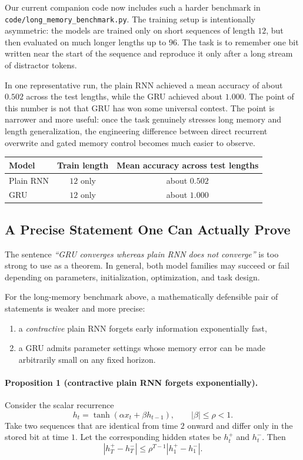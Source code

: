 \documentclass[12pt,a4paper]{article}
\begin{document}
Our current companion code now includes such a harder benchmark in
\texttt{code/long\_memory\_benchmark.py}. The training setup is intentionally asymmetric:
the models are trained only on short sequences of length \(12\), but then evaluated on much longer lengths up to \(96\). The task is to remember one bit written near the start of the sequence and reproduce it only after a long stream of distractor tokens.

In one representative run, the plain RNN achieved a mean accuracy of about \(0.502\) across the test lengths, while the GRU achieved about \(1.000\). The point of this number is not that GRU has won some universal contest. The point is narrower and more useful: once the task genuinely stresses long memory and length generalization, the engineering difference between direct recurrent overwrite and gated memory control becomes much easier to observe.

\begin{center}
\begin{tabular}{lcc}
\toprule
Model & Train length & Mean accuracy across test lengths \\
\midrule
Plain RNN & \(12\) only & about \(0.502\) \\
GRU & \(12\) only & about \(1.000\) \\
\bottomrule
\end{tabular}
\end{center}

\subsection{A Precise Statement One Can Actually Prove}

The sentence
\emph{``GRU converges whereas plain RNN does not converge''}
is too strong to use as a theorem. In general, both model families may succeed or fail depending on parameters, initialization, optimization, and task design.

For the long-memory benchmark above, a mathematically defensible pair of statements is weaker and more precise:
\begin{enumerate}
  \item a \emph{contractive} plain RNN forgets early information exponentially fast,
  \item a GRU admits parameter settings whose memory error can be made arbitrarily small on any fixed horizon.
\end{enumerate}

\paragraph{Proposition 1 (contractive plain RNN forgets exponentially).}
Consider the scalar recurrence
\[
h_t = \tanh(\alpha x_t + \beta h_{t-1}),
\qquad |\beta| \le \rho < 1.
\]
Take two sequences that are identical from time \(2\) onward and differ only in the stored bit at time \(1\). Let the corresponding hidden states be \(h_t^+\) and \(h_t^-\). Then
\[
|h_T^+ - h_T^-|
\le
\rho^{T-1}|h_1^+ - h_1^-|.
\]
\end{document}
